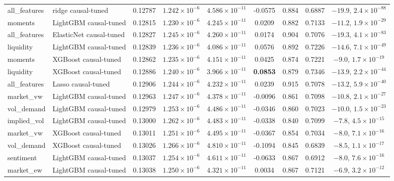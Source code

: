 \begin{table}[t]
\begin{tabular}{@{}llccccccc@{}}
all\_features & ridge causal-tuned & 0.12787 & $1.242 \times 10^{-6}$ & $4.586 \times 10^{-11}$ & -0.0575 & 0.884 & 0.6887 & $-19.9$, $2.4 \times 10^{-88}$ \\
moments & LightGBM causal-tuned & 0.12815 & $1.230 \times 10^{-6}$ & $4.245 \times 10^{-11}$ & 0.0209 & 0.882 & 0.7133 & $-11.2$, $1.9 \times 10^{-29}$ \\
all\_features & ElasticNet causal-tuned & 0.12827 & $1.245 \times 10^{-6}$ & $4.260 \times 10^{-11}$ & 0.0174 & 0.904 & 0.7076 & $-19.3$, $4.1 \times 10^{-83}$ \\
liquidity & LightGBM causal-tuned & 0.12839 & $1.236 \times 10^{-6}$ & $4.086 \times 10^{-11}$ & 0.0576 & 0.892 & 0.7226 & $-14.6$, $7.1 \times 10^{-49}$ \\
moments & XGBoost causal-tuned & 0.12862 & $1.235 \times 10^{-6}$ & $4.151 \times 10^{-11}$ & 0.0425 & 0.874 & 0.7221 & $-9.0$, $1.7 \times 10^{-19}$ \\
liquidity & XGBoost causal-tuned & 0.12886 & $1.240 \times 10^{-6}$ & $3.966 \times 10^{-11}$ & \textbf{0.0853} & 0.879 & 0.7346 & $-13.9$, $2.2 \times 10^{-44}$ \\
all\_features & Lasso causal-tuned & 0.12906 & $1.244 \times 10^{-6}$ & $4.232 \times 10^{-11}$ & 0.0239 & 0.915 & 0.7078 & $-13.2$, $5.9 \times 10^{-40}$ \\
market\_vw & LightGBM causal-tuned & 0.12963 & $1.247 \times 10^{-6}$ & $4.378 \times 10^{-11}$ & -0.0096 & 0.861 & 0.7098 & $-10.8$, $2.1 \times 10^{-27}$ \\
vol\_demand & LightGBM causal-tuned & 0.12979 & $1.253 \times 10^{-6}$ & $4.486 \times 10^{-11}$ & -0.0346 & 0.860 & 0.7023 & $-10.0$, $1.5 \times 10^{-23}$ \\
implied\_vol & LightGBM causal-tuned & 0.13000 & $1.262 \times 10^{-6}$ & $4.483 \times 10^{-11}$ & -0.0338 & 0.840 & 0.7099 & $-7.8$, $4.5 \times 10^{-15}$ \\
market\_vw & XGBoost causal-tuned & 0.13011 & $1.251 \times 10^{-6}$ & $4.495 \times 10^{-11}$ & -0.0367 & 0.854 & 0.7034 & $-8.0$, $7.1 \times 10^{-16}$ \\
vol\_demand & XGBoost causal-tuned & 0.13026 & $1.266 \times 10^{-6}$ & $4.810 \times 10^{-11}$ & -0.1094 & 0.845 & 0.6839 & $-8.5$, $1.1 \times 10^{-17}$ \\
sentiment & LightGBM causal-tuned & 0.13037 & $1.254 \times 10^{-6}$ & $4.611 \times 10^{-11}$ & -0.0633 & 0.867 & 0.6912 & $-8.0$, $7.6 \times 10^{-16}$ \\
market\_ew & LightGBM causal-tuned & 0.13038 & $1.250 \times 10^{-6}$ & $4.321 \times 10^{-11}$ & 0.0034 & 0.867 & 0.7121 & $-6.9$, $3.2 \times 10^{-12}$ \\

\end{tabular}
\end{table}
